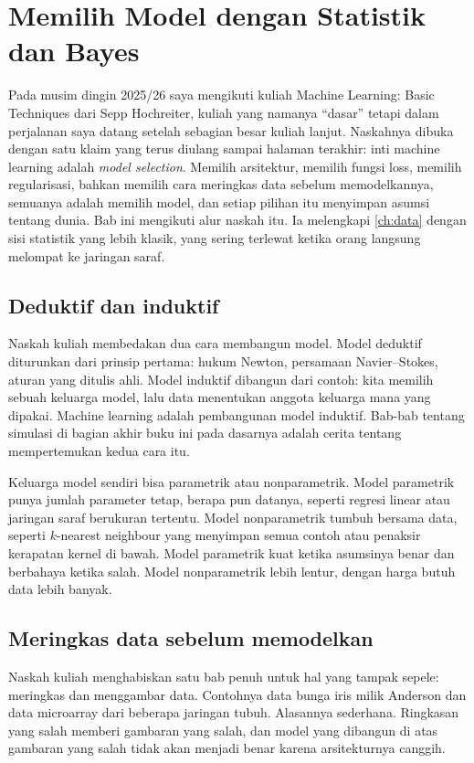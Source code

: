 \chapter{Memilih Model dengan Statistik dan Bayes}
\label{ch:stat}

Pada musim dingin 2025/26 saya mengikuti kuliah Machine Learning: Basic Techniques dari Sepp Hochreiter, kuliah yang
namanya ``dasar'' tetapi dalam perjalanan saya datang setelah sebagian besar kuliah lanjut. Naskahnya dibuka dengan satu klaim yang terus diulang sampai halaman terakhir: inti machine learning
adalah \emph{model selection}. Memilih arsitektur, memilih fungsi loss, memilih regularisasi, bahkan memilih cara meringkas
data sebelum memodelkannya, semuanya adalah memilih model, dan setiap pilihan itu menyimpan asumsi tentang dunia. Bab ini
mengikuti alur naskah itu. Ia melengkapi \cref{ch:data} dengan sisi statistik yang lebih klasik, yang sering terlewat
ketika orang langsung melompat ke jaringan saraf.

\section{Deduktif dan induktif}

Naskah kuliah membedakan dua cara membangun model. Model deduktif diturunkan dari prinsip pertama: hukum Newton, persamaan
Navier--Stokes, aturan yang ditulis ahli. Model induktif dibangun dari contoh: kita memilih sebuah keluarga model, lalu
data menentukan anggota keluarga mana yang dipakai. Machine learning adalah pembangunan model induktif. Bab-bab tentang
simulasi di bagian akhir buku ini pada dasarnya adalah cerita tentang mempertemukan kedua cara itu.

Keluarga model sendiri bisa parametrik atau nonparametrik. Model parametrik punya jumlah parameter tetap, berapa pun
datanya, seperti regresi linear atau jaringan saraf berukuran tertentu. Model nonparametrik tumbuh bersama data, seperti
$k$-nearest neighbour yang menyimpan semua contoh atau penaksir kerapatan kernel di bawah. Model parametrik kuat ketika
asumsinya benar dan berbahaya ketika salah. Model nonparametrik lebih lentur, dengan harga butuh data lebih banyak.

\section{Meringkas data sebelum memodelkan}

Naskah kuliah menghabiskan satu bab penuh untuk hal yang tampak sepele: meringkas dan menggambar data. Contohnya data bunga
iris milik Anderson dan data microarray dari beberapa jaringan tubuh. Alasannya sederhana. Ringkasan yang salah memberi
gambaran yang salah, dan model yang dibangun di atas gambaran yang salah tidak akan menjadi benar karena arsitekturnya
canggih.

